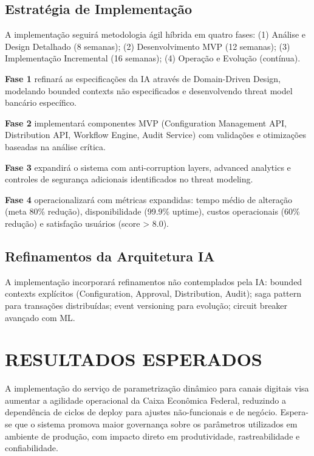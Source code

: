 \section{Estratégia de Implementação}

A implementação seguirá metodologia ágil híbrida em quatro fases: (1) Análise e Design Detalhado (8 semanas); (2) Desenvolvimento MVP (12 semanas); (3) Implementação Incremental (16 semanas); (4) Operação e Evolução (contínua).

\textbf{Fase 1} refinará as especificações da IA através de Domain-Driven Design, modelando bounded contexts não especificados e desenvolvendo threat model bancário específico.

\textbf{Fase 2} implementará componentes MVP (Configuration Management API, Distribution API, Workflow Engine, Audit Service) com validações e otimizações baseadas na análise crítica.

\textbf{Fase 3} expandirá o sistema com anti-corruption layers, advanced analytics e controles de segurança adicionais identificados no threat modeling.

\textbf{Fase 4} operacionalizará com métricas expandidas: tempo médio de alteração (meta 80\% redução), disponibilidade (99.9\% uptime), custos operacionais (60\% redução) e satisfação usuários (score > 8.0).

\section{Refinamentos da Arquitetura IA}

A implementação incorporará refinamentos não contemplados pela IA: bounded contexts explícitos (Configuration, Approval, Distribution, Audit); saga pattern para transações distribuídas; event versioning para evolução; circuit breaker avançado com ML.

\chapter{RESULTADOS ESPERADOS}

A implementação do serviço de parametrização dinâmico para canais digitais visa aumentar a agilidade operacional da Caixa Econômica Federal, reduzindo a dependência de ciclos de deploy para ajustes não-funcionais e de negócio. Espera-se que o sistema promova maior governança sobre os parâmetros utilizados em ambiente de produção, com impacto direto em produtividade, rastreabilidade e confiabilidade.

